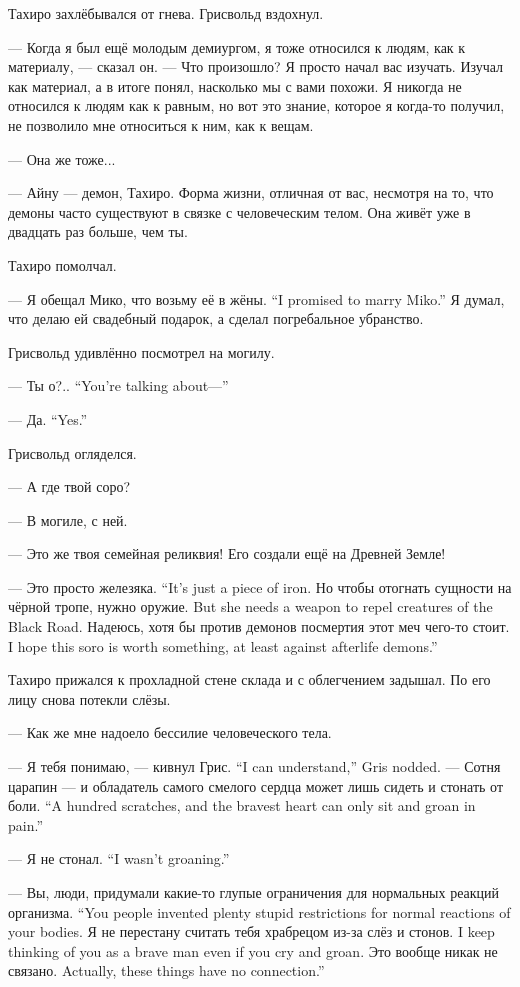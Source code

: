 Тахиро захлёбывался от гнева.
Грисвольд вздохнул.

--- Когда я был ещё молодым демиургом, я тоже относился к людям, как к материалу, --- сказал он.
--- Что произошло?
Я просто начал вас изучать.
Изучал как материал, а в итоге понял, насколько мы с вами похожи.
Я никогда не относился к людям как к равным, но вот это знание, которое я когда-то получил, не позволило мне относиться к ним, как к вещам.

--- Она же тоже...

--- Айну --- демон, Тахиро.
Форма жизни, отличная от вас, несмотря на то, что демоны часто существуют в связке с человеческим телом.
Она живёт уже в двадцать раз больше, чем ты.

Тахиро помолчал.

{--- Я обещал Мико, что возьму её в жёны.}
{``I promised to marry Miko.''}
Я думал, что делаю ей свадебный подарок, а сделал погребальное убранство.

Грисвольд удивлённо посмотрел на могилу.

{--- Ты о?..}
{``You're talking about---''}

{--- Да.}
{``Yes.''}

Грисвольд огляделся.

--- А где твой соро?

--- В могиле, с ней.

--- Это же твоя семейная реликвия!
Его создали ещё на Древней Земле!

{--- Это просто железяка.}
{``It's just a piece of iron.}
{Но чтобы отогнать сущности на чёрной тропе, нужно оружие.}
{But she needs a weapon to repel creatures of the Black Road.}
{Надеюсь, хотя бы против демонов посмертия этот меч чего-то стоит.}
{I hope this soro is worth something, at least against afterlife demons.''}

Тахиро прижался к прохладной стене склада и с облегчением задышал.
По его лицу снова потекли слёзы.

--- Как же мне надоело бессилие человеческого тела.

{--- Я тебя понимаю, --- кивнул Грис.}
{``I can understand,'' Gris nodded.}
{--- Сотня царапин --- и обладатель самого смелого сердца может лишь сидеть и стонать от боли.}
{``A hundred scratches, and the bravest heart can only sit and groan in pain.''}

{--- Я не стонал.}
{``I wasn't groaning.''}

{--- Вы, люди, придумали какие-то глупые ограничения для нормальных реакций организма.}
{``You people invented plenty stupid restrictions for normal reactions of your bodies.}
{Я не перестану считать тебя храбрецом из-за слёз и стонов.}
{I keep thinking of you as a brave man even if you cry and groan.}
{Это вообще никак не связано.}
{Actually, these things have no connection.''}

